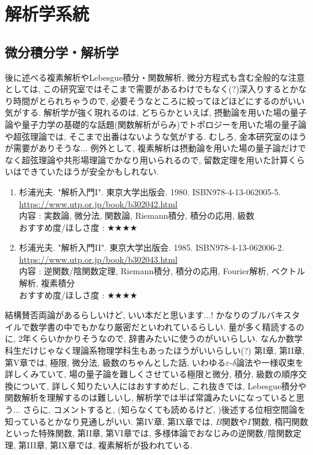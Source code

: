 \documentclass[10pt,a4paper]{jsarticle}
\begin{document}
\section{解析学系統} 
\subsection{微分積分学・解析学}
    後に述べる複素解析やLebesgue積分・関数解析, 微分方程式も含む全般的な注意としては, この研究室ではそこまで需要があるわけでもなく(?)深入りするとかなり時間がとられちゃうので, 必要そうなところに絞ってほどほどにするのがいい気がする. 解析学が強く現れるのは, どちらかといえば, 摂動論を用いた場の量子論や量子力学の基礎的な話題(関数解析がらみ)でトポロジーを用いた場の量子論や超弦理論では, そこまで出番はないような気がする. むしろ, 金本研究室のほうが需要がありそうな... 例外として, 複素解析は摂動論を用いた場の量子論だけでなく超弦理論や共形場理論でかなり用いられるので, 留数定理を用いた計算くらいはできていたほうが安全かもしれない. 
    \begin{enumerate}
        \renewcommand{\theenumi}{[AN\arabic{enumi}]}
        \renewcommand{\labelenumi}{\theenumi}
        \setcounter{enumi}{0}
        \item \label{SMAN1} 杉浦光夫. "解析入門I". 東京大学出版会. 1980. ISBN978-4-13-062005-5. \\
        \url{https://www.utp.or.jp/book/b302042.html} \\
        内容 : 実数論, 微分法, 関数論, Riemann積分, 積分の応用, 級数\\
        おすすめ度/ほしさ度 : $\bigstar \bigstar \bigstar \bigstar $
        \item \label{SMAN2} 杉浦光夫. "解析入門II". 東京大学出版会. 1985. ISBN978-4-13-062006-2. \\
        \url{https://www.utp.or.jp/book/b302043.html} \\
        内容 : 逆関数/陰関数定理, Riemann積分, 積分の応用, Fourier解析, ベクトル解析, 複素積分\\
        おすすめ度/ほしさ度 : $\bigstar \bigstar \bigstar \bigstar $
    \end{enumerate}\par
    結構賛否両論があるらしいけど, いい本だと思います...! かなりのブルバキスタイルで数学書の中でもかなり厳密だといわれているらしい. 量が多く精読するのに, 2年くらいかかりそうなので, 辞書みたいに使うのがいいらしい. なんか数学科生だけじゃなく理論系物理学科生もあったほうがいいらしい(?) 第I章, 第II章, 第V章では, 極限, 微分法, 級数のちゃんとした話, いわゆる$\varepsilon$-$\delta$論法や一様収束を詳しくみていて, 場の量子論を難しくさせている極限と微分, 積分, 級数の順序交換について, 詳しく知りたい人にはおすすめだし, これ抜きでは, Lebesgue積分や関数解析を理解するのは難しいし, 解析学では半ば常識みたいになっていると思う... さらに, コメントすると, (知らなくても読めるけど, )後述する位相空間論を知っているとかなり見通しがいい. 第IV章, 第IX章では, $B$関数や$\varGamma$関数, 楕円関数といった特殊関数, 第II章, 第VI章では, 多様体論でおなじみの逆関数/陰関数定理, 第III章, 第IX章では, 複素解析が扱われている. \par
\end{document}
